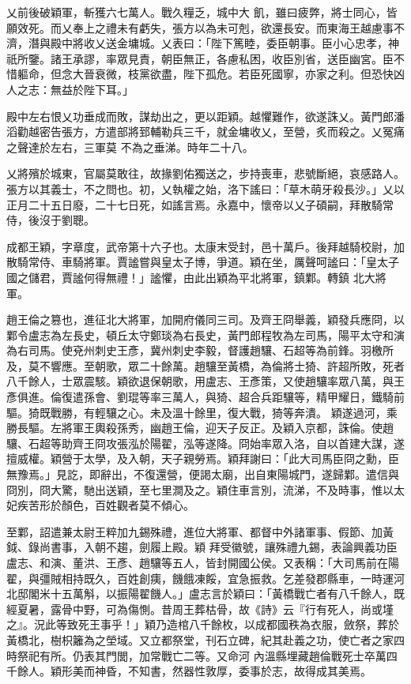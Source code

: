 \begin{pinyinscope}
 乂前後破穎軍，斬獲六七萬人。戰久糧乏，城中大
 飢，雖曰疲弊，將士同心，皆願效死。而乂奉上之禮未有虧失，張方以為未可剋，欲還長安。而東海王越慮事不濟，潛與殿中將收乂送金墉城。乂表曰：「陛下篤睦，委臣朝事。臣小心忠孝，神祇所鑒。諸王承謬，率眾見責，朝臣無正，各慮私困，收臣別省，送臣幽宮。臣不惜軀命，但念大晉衰微，枝黨欲盡，陛下孤危。若臣死國寧，亦家之利。但恐快凶人之志：無益於陛下耳。」



 殿中左右恨乂功垂成而敗，謀劫出之，更以距穎。越懼難作，欲遂誅乂。黃門郎潘滔勸越密告張方，方遣部將郅輔勒兵三千，就金墉收乂，至營，炙而殺之。乂冤痛之聲達於左右，三軍莫
 不為之垂涕。時年二十八。



 乂將殯於城東，官屬莫敢往，故掾劉佑獨送之，步持喪車，悲號斷絕，哀感路人。張方以其義士，不之問也。初，乂執權之始，洛下謠曰：「草木萌牙殺長沙。」乂以正月二十五日廢，二十七日死，如謠言焉。永嘉中，懷帝以乂子碩嗣，拜散騎常侍，後沒于劉聰。



 成都王穎，字章度，武帝第十六子也。太康末受封，邑十萬戶。後拜越騎校尉，加散騎常侍、車騎將軍。賈謐嘗與皇太子博，爭道。穎在坐，厲聲呵謐曰：「皇太子國之儲君，賈謐何得無禮！」謐懼，由此出穎為平北將軍，鎮鄴。轉鎮
 北大將軍。



 趙王倫之篡也，進征北大將軍，加開府儀同三司。及齊王冏舉義，穎發兵應冏，以鄴令盧志為左長史，頓丘太守鄭琰為右長史，黃門郎程牧為左司馬，陽平太守和演為右司馬。使兗州刺史王彥，冀州刺史李毅，督護趙驤、石超等為前鋒。羽檄所及，莫不響應。至朝歌，眾二十餘萬。趙驤至黃橋，為倫將士猗、許超所敗，死者八千餘人，士眾震駭。穎欲退保朝歌，用盧志、王彥策，又使趙驤率眾八萬，與王彥俱進。倫復遣孫會、劉琨等率三萬人，與猗、超合兵距驤等，精甲耀日，鐵騎前驅。猗既戰勝，有輕驤之心。未及溫十餘里，復大戰，猗等奔潰。
 穎遂過河，乘勝長驅。左將軍王輿殺孫秀，幽趙王倫，迎天子反正。及穎入京都，誅倫。使趙驤、石超等助齊王冏攻張泓於陽翟，泓等遂降。冏始率眾入洛，自以首建大謀，遂擅威權。穎營于太學，及入朝，天子親勞焉。穎拜謝曰：「此大司馬臣冏之勳，臣無豫焉。」見訖，即辭出，不復還營，便謁太廟，出自東陽城門，遂歸鄴。遣信與冏別，冏大驚，馳出送穎，至七里澗及之。穎住車言別，流涕，不及時事，惟以太妃疾苦形於顏色，百姓觀者莫不傾心。



 至鄴，詔遣兼太尉王粹加九錫殊禮，進位大將軍、都督中外諸軍事、假節、加黃鉞、錄尚書事，入朝不趨，劍履上殿。穎
 拜受徽號，讓殊禮九錫，表論興義功臣盧志、和演、董洪、王彥、趙驤等五人，皆封開國公侯。又表稱：「大司馬前在陽翟，與彊賊相持既久，百姓創痍，饑餓凍餒，宜急振救。乞差發郡縣車，一時運河北邸閣米十五萬斛，以振陽翟饑人。」盧志言於穎曰：「黃橋戰亡者有八千餘人，既經夏暑，露骨中野，可為傷惻。昔周王葬枯骨，故《詩》云『行有死人，尚或墐之』。況此等致死王事乎！」穎乃造棺八千餘枚，以成都國秩為衣服，斂祭，葬於黃橋北，樹枳籬為之塋域。又立都祭堂，刊石立碑，紀其赴義之功，使亡者之家四時祭祀有所。仍表其門閭，加常戰亡二等。又命河
 內溫縣埋藏趙倫戰死士卒萬四千餘人。穎形美而神昏，不知書，然器性敦厚，委事於志，故得成其美焉。




\end{pinyinscope}
